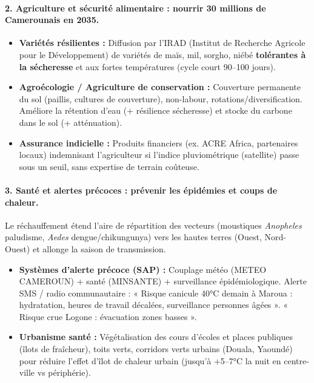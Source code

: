 \documentclass[11pt]{article}
\begin{document}
\paragraph{2. Agriculture et sécurité alimentaire : nourrir 30 millions de Camerounais en 2035.}
\begin{itemize}
    \item \textbf{Variétés résilientes :} Diffusion par l'IRAD (Institut de Recherche Agricole pour le Développement) de variétés de maïs, mil, sorgho, niébé \textbf{tolérantes à la sécheresse} et aux fortes températures (cycle court 90--100 jours).
    \item \textbf{Agroécologie / Agriculture de conservation :} Couverture permanente du sol (paillis, cultures de couverture), non-labour, rotations/diversification. Améliore la rétention d'eau (+ résilience sécheresse) et stocke du carbone dans le sol (+ atténuation).
    \item \textbf{Assurance indicielle :} Produits financiers (ex. ACRE Africa, partenaires locaux) indemnisant l'agriculteur si l'indice pluviométrique (satellite) passe sous un seuil, sans expertise de terrain coûteuse.
\end{itemize}

\paragraph{3. Santé et alertes précoces : prévenir les épidémies et coups de chaleur.}
Le réchauffement étend l'aire de répartition des vecteurs (moustiques \emph{Anopheles} paludisme, \emph{Aedes} dengue/chikungunya) vers les hautes terres (Ouest, Nord-Ouest) et allonge la saison de transmission.
\begin{itemize}
    \item \textbf{Systèmes d'alerte précoce (SAP) :} Couplage météo (METEO CAMEROUN) + santé (MINSANTE) + surveillance épidémiologique. Alerte SMS / radio communautaire : « Risque canicule 40°C demain à Maroua : hydratation, heures de travail décalées, surveillance personnes âgées ». « Risque crue Logone : évacuation zones basses ».
    \item \textbf{Urbanisme santé :} Végétalisation des cours d'écoles et places publiques (îlots de fraîcheur), toits verts, corridors verts urbains (Douala, Yaoundé) pour réduire l'effet d'îlot de chaleur urbain (jusqu'à +5--7°C la nuit en centre-ville vs périphérie).
\end{itemize}
\end{document}
